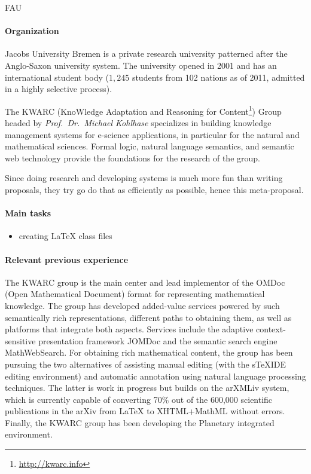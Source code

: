 \begin{sitedescription}{FAU}

\paragraph{Organization} Jacobs University Bremen is a private research university patterned
after the Anglo-Saxon university system.  The university opened in
2001 and has an international student body ($1,245$ students from 102
nations as of 2011, admitted in a highly selective process).

The KWARC (KnoWledge Adaptation and Reasoning for
Content\footnote{\url{http://kwarc.info}}) Group headed by
{\emph{Prof.\ Dr.\ Michael Kohlhase}} specializes in building
knowledge management systems for e-science applications, in particular
for the natural and mathematical sciences.  Formal logic, natural
language semantics, and semantic web technology provide the
foundations for the research of the group.
  
  Since doing research and developing systems is much more fun than writing proposals,
  they try go do that as efficiently as possible, hence this meta-proposal. 

\paragraph{Main tasks}

\begin{itemize}
\item creating {\LaTeX} class files
\end{itemize}

\paragraph{Relevant previous experience}

The KWARC group is the main center and lead implementor of the OMDoc
(Open Mathematical Document) format for representing mathematical
knowledge.  The group has developed added-value services powered by such semantically rich representations, different paths to obtaining them, as well as platforms that integrate both aspects.  Services include the adaptive context-sensitive presentation framework JOMDoc and the semantic search engine MathWebSearch.  For obtaining rich mathematical content, the group has been pursuing the two alternatives of assisting manual editing (with the sTeXIDE editing environment) and automatic annotation using natural language processing techniques.  The latter is work in progress but builds on the arXMLiv system, which is currently capable of converting 70\% out of the 600,000 scientific publications in the arXiv from {\LaTeX} to XHTML+MathML without errors.  Finally, the KWARC group has been developing the Planetary integrated environment.


\end{sitedescription}
